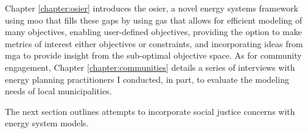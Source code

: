 Chapter \ref{chapter:osier} introduces the \acf{osier}, a novel energy systems
framework using \ac{moo} that fills these gaps by using \acp{ga} that allows for
efficient modeling of many objectives, enabling user-defined objectives,
providing the option to make metrics of interest either objectives or
constraints, and incorporating ideas from \ac{mga} to provide insight from the
sub-optimal objective space. As for community engagement, Chapter
\ref{chapter:communities} details a series of interviews with energy planning
practitioners I conducted, in part, to evaluate the modeling needs of local
municipalities.



The next section outlines attempts to incorporate social justice concerns with
energy system models.







